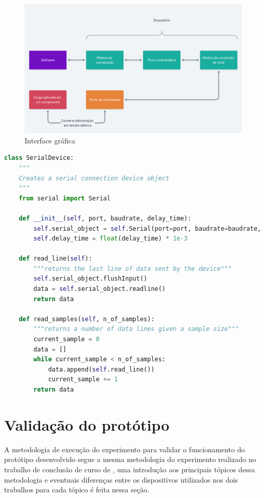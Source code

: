 \begin{figure}[htb]
	\caption{\label{fig:2035} Interface gráfica}
	\begin{center}
		\includegraphics[width=\textwidth]{pictures/2035.png}
	\end{center}
\end{figure}

\begin{lstlisting}[language=Python,caption={[SerialDevice]{Objeto SerialDevice}}]
class SerialDevice:
    """
    Creates a serial connection device object
    """
    from serial import Serial

    def __init__(self, port, baudrate, delay_time):
        self.serial_object = self.Serial(port=port, baudrate=baudrate, timeout=1)
        self.delay_time = float(delay_time) * 1e-3

    def read_line(self):
        """returns the last line of data sent by the device"""
        self.serial_object.flushInput()
        data = self.serial_object.readline()
        return data

    def read_samples(self, n_of_samples):
        """returns a number of data lines given a sample size"""
        current_sample = 0
        data = []
        while current_sample < n_of_samples:
            data.append(self.read_line())
            current_sample += 1
        return data
\end{lstlisting}



\section{Validação do protótipo}

A metodologia de execução do experimento para validar o funcionamento do protótipo desenvolvido segue a mesma metodologia do experimento realizado no trabalho de conclusão
de curso de \autocite{Minela2017}, uma introdução aos principais tópicos dessa metodologia e eventuais diferenças entre os dispositivos utilizados nos dois trabalhos para cada tópico é feita nessa seção.

